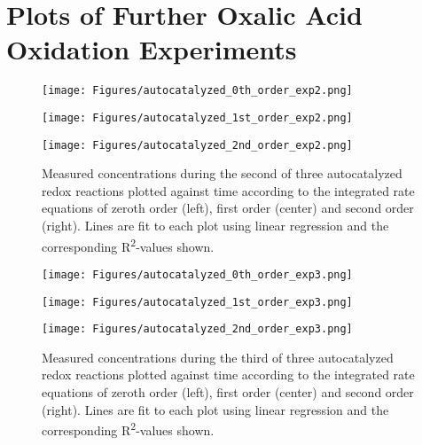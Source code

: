 \documentclass[titlepage]{article}
\begin{document}
\section{Plots of Further Oxalic Acid Oxidation Experiments}
\begin{figure}[H]
    \centering
    \begin{minipage}[c]{0.32\textwidth}
        \texttt{[image: Figures/autocatalyzed\_0th\_order\_exp2.png]}
    \end{minipage}
    \begin{minipage}[c]{0.32\textwidth}
        \texttt{[image: Figures/autocatalyzed\_1st\_order\_exp2.png]}
    \end{minipage}
    \begin{minipage}[c]{0.32\textwidth}
        \texttt{[image: Figures/autocatalyzed\_2nd\_order\_exp2.png]}
    \end{minipage}
    \caption{Measured concentrations during the second of three autocatalyzed redox reactions plotted against time according to the integrated rate equations of zeroth order (left), first order (center) and second order (right). Lines are fit to each plot using linear regression and the corresponding R\textsuperscript{2}-values shown.}
    \label{fig_kmno_autocatalyzed_rates_exp2}
\end{figure}
\begin{figure}[H]
    \centering
    \begin{minipage}[c]{0.32\textwidth}
        \texttt{[image: Figures/autocatalyzed\_0th\_order\_exp3.png]}
    \end{minipage}
    \begin{minipage}[c]{0.32\textwidth}
        \texttt{[image: Figures/autocatalyzed\_1st\_order\_exp3.png]}
    \end{minipage}
    \begin{minipage}[c]{0.32\textwidth}
        \texttt{[image: Figures/autocatalyzed\_2nd\_order\_exp3.png]}
    \end{minipage}
    \caption{Measured concentrations during the third of three autocatalyzed redox reactions plotted against time according to the integrated rate equations of zeroth order (left), first order (center) and second order (right). Lines are fit to each plot using linear regression and the corresponding R\textsuperscript{2}-values shown.}
    \label{fig_kmno_autocatalyzed_rates_exp3}
\end{figure}
\end{document}

